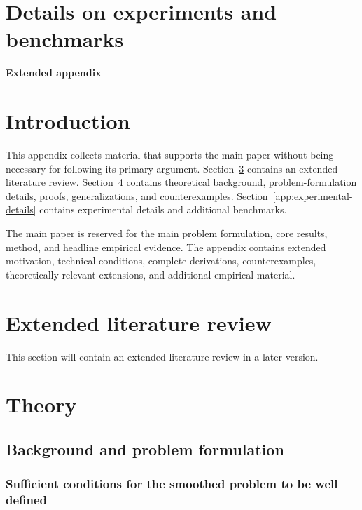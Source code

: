 \section{Details on experiments and benchmarks}

\begin{center}
{\Large\bfseries Extended appendix}
\end{center}

\section{Introduction}
\label{app:introduction}

This appendix collects material that supports the main paper without being necessary for following its primary argument. Section~\ref{app:extended-literature-review} contains an extended literature review. Section~\ref{app:theory} contains theoretical background, problem-formulation details, proofs, generalizations, and counterexamples. Section~\ref{app:experimental-details} contains experimental details and additional benchmarks.

The main paper is reserved for the main problem formulation, core results, method, and headline empirical evidence. The appendix contains extended motivation, technical conditions, complete derivations, counterexamples, theoretically relevant extensions, and additional empirical material.

\section{Extended literature review}
\label{app:extended-literature-review}
\label{app:additional-literature-review}

This section will contain an extended literature review in a later version.

\section{Theory}
\label{app:theory}

\subsection{Background and problem formulation}
\label{app:background-problem-formulation}

\subsubsection{Sufficient conditions for the smoothed problem to be well defined}
\label{app:smoothed-problem-well-defined}

